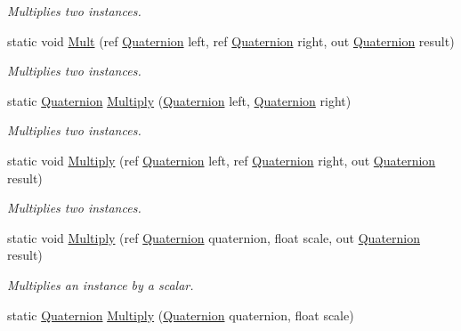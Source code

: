 \begin{DoxyCompactItemize}
\begin{DoxyCompactList}\small\item\em Multiplies two instances. \end{DoxyCompactList}\item 
static void \hyperlink{struct_open_t_k_1_1_quaternion_ad0e67d8b7266915adf0bfae31d6757b9}{Mult} (ref \hyperlink{struct_open_t_k_1_1_quaternion}{Quaternion} left, ref \hyperlink{struct_open_t_k_1_1_quaternion}{Quaternion} right, out \hyperlink{struct_open_t_k_1_1_quaternion}{Quaternion} result)
\begin{DoxyCompactList}\small\item\em Multiplies two instances. \end{DoxyCompactList}\item 
static \hyperlink{struct_open_t_k_1_1_quaternion}{Quaternion} \hyperlink{struct_open_t_k_1_1_quaternion_a1fa69eacde2186a08be8eaecb818efb4}{Multiply} (\hyperlink{struct_open_t_k_1_1_quaternion}{Quaternion} left, \hyperlink{struct_open_t_k_1_1_quaternion}{Quaternion} right)
\begin{DoxyCompactList}\small\item\em Multiplies two instances. \end{DoxyCompactList}\item 
static void \hyperlink{struct_open_t_k_1_1_quaternion_ac2020c45a1c9e109c9b5667e0ed3c0bc}{Multiply} (ref \hyperlink{struct_open_t_k_1_1_quaternion}{Quaternion} left, ref \hyperlink{struct_open_t_k_1_1_quaternion}{Quaternion} right, out \hyperlink{struct_open_t_k_1_1_quaternion}{Quaternion} result)
\begin{DoxyCompactList}\small\item\em Multiplies two instances. \end{DoxyCompactList}\item 
static void \hyperlink{struct_open_t_k_1_1_quaternion_aec98462c1fa302496cc639c8d95da343}{Multiply} (ref \hyperlink{struct_open_t_k_1_1_quaternion}{Quaternion} quaternion, float scale, out \hyperlink{struct_open_t_k_1_1_quaternion}{Quaternion} result)
\begin{DoxyCompactList}\small\item\em Multiplies an instance by a scalar. \end{DoxyCompactList}\item 
static \hyperlink{struct_open_t_k_1_1_quaternion}{Quaternion} \hyperlink{struct_open_t_k_1_1_quaternion_aca2a12afdd23d4fc851a9db604bff627}{Multiply} (\hyperlink{struct_open_t_k_1_1_quaternion}{Quaternion} quaternion, float scale)

\end{DoxyCompactItemize}
